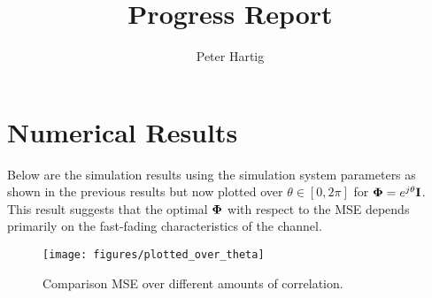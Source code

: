 \documentclass[12pt,a4paper]{report}
\title{Progress Report}
\author{Peter Hartig}
\begin{document}
\maketitle
\tableofcontents

\section{Numerical Results}
Below are the simulation results using the simulation system parameters as shown in the previous results but now plotted over $\theta \in [0, 2\pi]$ for $\boldsymbol{\Phi} = e^{j\theta}\mathbf{I}$. This result suggests that the optimal $\boldsymbol{\Phi}$ with respect to the MSE depends  primarily on the fast-fading characteristics of the channel.
		\begin{figure}[H]
	\texttt{[image: figures/plotted\_over\_theta]}
	  \caption{Comparison MSE over different amounts of correlation.}
	  	  \label{MSE_correlation}
	\end{figure} 
\end{document}
